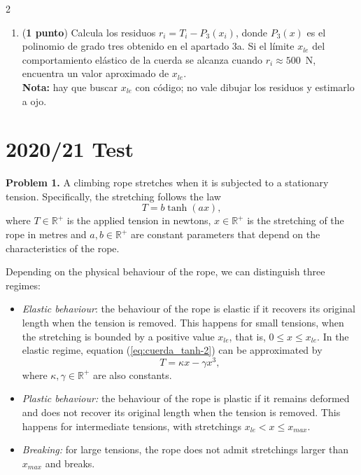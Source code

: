 \begin{paracol}{2}
\begin{enumerate}
\item (\textbf{1 punto}) Calcula los residuos $r_i = T_i - P_3(x_i)$, donde $P_3(x)$ es el polinomio de grado tres obtenido en el apartado 3a. Si el límite $x_{le}$ del comportamiento elástico de la cuerda se alcanza cuando $r_i \approx 500$~N, encuentra un valor aproximado de $x_{le}$. \\
\textbf{Nota:} hay que buscar $x_{le}$ con código; no vale dibujar los residuos y estimarlo a ojo.
\end{enumerate}

\switchcolumn
\section{2020/21 Test}
\noindent \textbf{Problem 1.} A climbing rope stretches when it is subjected to a stationary tension. Specifically, the stretching follows the law
\begin{equation}\label{eq:cuerda_tanh-2}
	T = b\tanh(ax),
\end{equation}
where $T \in \mathbb{R}^+$ is the applied tension in newtons, $x \in \mathbb{R}^+$ is the stretching of the rope in metres and $a, b \in \mathbb{R}^+$ are constant parameters that depend on the characteristics of the rope.

Depending on the physical behaviour of the rope, we can distinguish three regimes:

\begin{itemize}
	 \item \emph{Elastic behaviour}: the behaviour of the rope is elastic if it recovers its original length when the tension is removed. This happens for small tensions, when the stretching is bounded by a positive value $x_{le}$, that is, $0 \le x \le x_{le}$. In the elastic regime, equation (\ref{eq:cuerda_tanh-2}) can be approximated by
	\begin{equation}\label{eq:cuerda_pol-2}
		T = \kappa x - \gamma x^3,
	\end{equation}
	where $\kappa, \gamma \in \mathbb{R}^+$ are also constants.

	\item \emph{Plastic behaviour:} the behaviour of the rope is plastic if it remains deformed and does not recover its original length when the tension is removed. This happens for intermediate tensions, with stretchings $x_{le} < x \le x_{max}$.

	\item \emph{Breaking:} for large tensions, the rope does not admit stretchings larger than $x_{max}$ and breaks.
\end{itemize}


\end{paracol}

